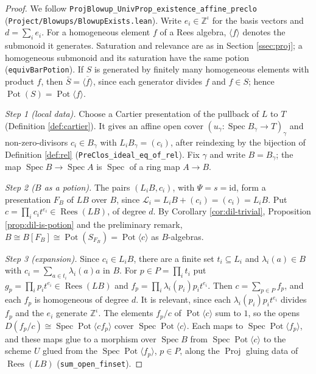 \documentclass[pdflatex,sn-mathphys-num]{sn-jnl}
\theoremstyle{plain}
\theoremstyle{definition}
\newcommand{\Spec}{\operatorname{Spec}}
\newcommand{\Proj}{\operatorname{Proj}}
\newcommand{\Rees}{\operatorname{Rees}}
\newcommand{\Pot}{\operatorname{Pot}}
\newcommand{\Int}{\mathbb{Z}}
\newcommand{\cL}{\mathcal{L}}
\begin{document}
\begin{proof}
We follow \texttt{ProjBlowup\_UnivProp\_existence\_affine\_preclo}
(\texttt{Project/Blowups/BlowupExists.lean}). Write $e_i\in\Int^\iota$ for the
basis vectors and $d=\sum_i e_i$. For a homogeneous element $f$ of a Rees
algebra, $\langle f\rangle$ denotes the submonoid it generates. Saturation and relevance are as in Section \ref{ssec:proj}; a homogeneous submonoid and its saturation have the same potion (\texttt{equivBarPotion}). If $S$ is generated by finitely many
homogeneous elements with product $f$, then $\bar S=\overline{\langle f\rangle}$,
since each generator divides $f$ and $f\in S$; hence $\Pot(S)=\Pot\langle f\rangle$.

\emph{Step 1 (local data).} Choose a Cartier presentation of the pullback of $L$
to $T$ (Definition \ref{def:cartier}). It gives an affine open cover
$(u_\gamma:\Spec B_\gamma\to T)_\gamma$ and non-zero-divisors $c_i\in B_\gamma$
with $L_iB_\gamma=(c_i)$, after reindexing by the bijection of Definition \ref{def:rel} (\texttt{PreClos\_ideal\_eq\_of\_rel}). Fix $\gamma$ and
write $B=B_\gamma$; the map $\Spec B\to\Spec A$ is $\Spec$ of a ring map $A\to B$.

\emph{Step 2 ($B$ as a potion).} The pairs $(L_iB,c_i)$, with
$\Psi=s=\mathrm{id}$, form a presentation $F_B$ of $LB$ over $B$, since
$\cL_i=L_iB+(c_i)=(c_i)=L_iB$. Put $c=\prod_i c_it^{e_i}\in\Rees(LB)$, of degree
$d$. By Corollary \ref{cor:dil-trivial}, Proposition \ref{prop:dil-is-potion} and
the preliminary remark, $B\cong B[F_B]\cong\Pot(S_{F_B})=\Pot\langle c\rangle$ as
$B$-algebras.

\emph{Step 3 (expansion).} Since $c_i\in L_iB$, there are a finite set
$t_i\subseteq L_i$ and $\lambda_i(a)\in B$ with $c_i=\sum_{a\in t_i}\lambda_i(a)a$
in $B$. For $p\in P=\prod_i t_i$ put $g_p=\prod_i p_it^{e_i}\in\Rees(LB)$ and
$f_p=\prod_i\lambda_i(p_i)p_it^{e_i}$. Then $c=\sum_{p\in P}f_p$, and each $f_p$
is homogeneous of degree $d$. It is relevant, since each
$\lambda_i(p_i)p_it^{e_i}$ divides $f_p$ and the $e_i$ generate $\Int^\iota$. The
elements $f_p/c$ of $\Pot\langle c\rangle$ sum to $1$, so the opens
$D(f_p/c)\cong\Spec\Pot\langle cf_p\rangle$ cover $\Spec\Pot\langle c\rangle$.
Each maps to $\Spec\Pot\langle f_p\rangle$, and these maps glue to a morphism over
$\Spec B$ from $\Spec\Pot\langle c\rangle$ to the scheme $U$ glued from the
$\Spec\Pot\langle f_p\rangle$, $p\in P$, along the $\Proj$ gluing data of
$\Rees(LB)$ (\texttt{sum\_open\_finset}).


\end{proof}
\end{document}
